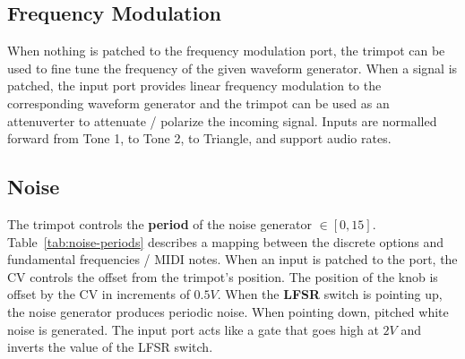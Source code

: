 \documentclass[12pt,letter]{article}
\begin{document}
\subsection{Frequency Modulation}

When nothing is patched to the frequency modulation port, the trimpot can be used to fine tune the frequency of the given waveform generator. When a signal is patched, the input port provides linear frequency modulation to the corresponding waveform generator and the trimpot can be used as an attenuverter to attenuate / polarize the incoming signal. Inputs are normalled forward from Tone 1, to Tone 2, to Triangle, and support audio rates.

\subsection{Noise}

The trimpot controls the \textbf{period} of the noise generator $\in [0, 15]$. Table~\ref{tab:noise-periods} describes a mapping between the discrete options and fundamental frequencies / MIDI notes. When an input is patched to the port, the CV controls the offset from the trimpot's position. The position of the knob is offset by the CV in increments of $0.5V$. When the \textbf{LFSR} switch is pointing up, the noise generator produces periodic noise. When pointing down, pitched white noise is generated. The input port acts like a gate that goes high at $2V$ and inverts the value of the LFSR switch.
\end{document}
